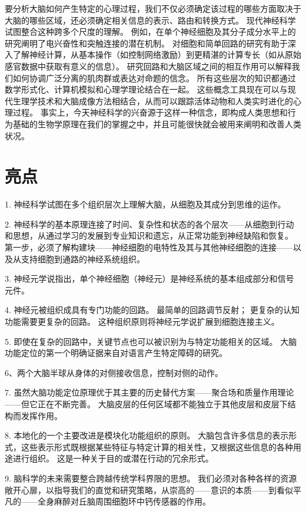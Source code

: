 要分析大脑如何产生特定的心理过程，我们不仅必须确定该过程的哪些方面取决于大脑的哪些区域，还必须确定相关信息的表示、路由和转换方式。
现代神经科学试图整合这种跨多个尺度的理解。
例如，在单个神经细胞及其分子成分水平上的研究阐明了电兴奋性和突触连接的潜在机制。
对细胞和简单回路的研究有助于深入了解神经计算，从基本操作（如控制网络激励）到更精湛的计算专长（如从原始感官数据中获取有意义的信息）。
研究回路和大脑区域之间的相互作用可以解释我们如何协调广泛分离的肌肉群或表达对命题的信念。
所有这些层次的知识都通过数学形式化、计算机模拟和心理学理论结合在一起。
这些概念工具现在可以与现代生理学技术和大脑成像方法相结合，从而可以跟踪活体动物和人类实时进化的心理过程。
事实上，今天神经科学的兴奋源于这样一种信念，即构成人类思想和行为基础的生物学原理在我们的掌握之中，并且可能很快就会被用来阐明和改善人类状况。




\section{亮点}

1. 神经科学试图在多个组织层次上理解大脑，从细胞及其成分到思维的运作。


2. 神经科学的基本原理连接了时间、复杂性和状态的各个层次——从细胞到行动和思想，从通过学习的发展到专业知识和遗忘，从正常功能到神经缺陷和恢复。
第一步，必须了解构建块——神经细胞的电特性及其与其他神经细胞的连接——以及从支持细胞到通路的神经系统组织。


3. 神经元学说指出，单个神经细胞（神经元）是神经系统的基本组成部分和信号元件。


4. 神经元被组织成具有专门功能的回路。
最简单的回路调节反射；
更复杂的认知功能需要更复杂的回路。
这种组织原则将神经元学说扩展到细胞连接主义。


5. 即使在复杂的回路中，关键节点也可以被识别为与特定功能相关的区域。
大脑功能定位的第一个明确证据来自对语言产生特定障碍的研究。


6、两个大脑半球从身体的对侧接收信息，控制对侧的动作。


7. 虽然大脑功能定位原理优于其主要的历史替代方案——聚合场和质量作用理论——但它正在不断完善。
大脑皮层的任何区域都不能独立于其他皮层和皮层下结构而发挥作用。


8. 本地化的一个主要改进是模块化功能组织的原则。 大脑包含许多信息的表示形式，这些表示形式既根据某些特征与特定计算的相关性，又根据这些信息的各种用途进行组织。
这是一种关于目的或潜在行动的冗余形式。


9. 脑科学的未来需要整合跨越传统学科界限的思想。
我们必须对各种各样的资源敞开心扉，以指导我们的直觉和研究策略，从崇高的——意识的本质——到看似平凡的——全身麻醉对丘脑周围细胞环中钙传感器的作用。

